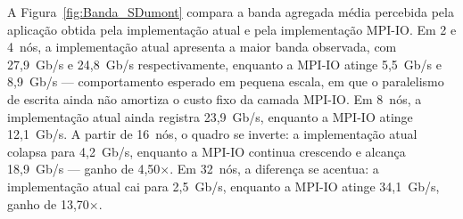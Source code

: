 \begin{table}[H]
\centering
\caption{Resumo comparativo entre a implementação atual e MPI-IO no
Experimento SDumont. Este trabalho calcula a melhoria no total e a melhoria
de I/O em relação à implementação atual; valores negativos indicam
piora.}
\label{tab:comparativo_sdumont}
\small
\setlength{\tabcolsep}{3pt}
\renewcommand{\arraystretch}{1.25}
\end{table}

A Figura~\ref{fig:Banda_SDumont} compara a banda agregada média
percebida pela aplicação
obtida pela implementação atual e pela implementação MPI-IO. Em 2 e
4~nós, a implementação atual apresenta a maior banda observada, com
27{,}9~Gb/s e 24{,}8~Gb/s respectivamente, enquanto a MPI-IO atinge
5{,}5~Gb/s e 8{,}9~Gb/s --- comportamento esperado em pequena
escala, em que o paralelismo de escrita ainda não amortiza o custo fixo
da camada MPI-IO. Em 8~nós, a implementação atual ainda
registra 23{,}9~Gb/s, enquanto a MPI-IO atinge 12{,}1~Gb/s. A partir de
16~nós, o quadro se inverte: a implementação atual colapsa para
4{,}2~Gb/s, enquanto a MPI-IO continua crescendo e alcança 18{,}9~Gb/s --- ganho
de 4{,}50$\times$. Em 32~nós, a diferença se acentua: a implementação
atual cai para 2{,}5~Gb/s, enquanto a MPI-IO atinge 34{,}1~Gb/s,
ganho de 13{,}70$\times$.

